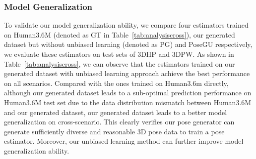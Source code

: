 \documentclass[runningheads]{llncs}
\begin{document}
\subsubsection{Model Generalization} 
To validate our model generalization ability, we compare four estimators trained on Human3.6M (denoted as GT in Table~\ref{tab:analysiscross}), our generated dataset but without unbiased learning (denoted as PG) and PoseGU respectively, we evaluate these estimators on test sets of 3DHP and 3DPW.
As shown in Table~\ref{tab:analysiscross}, we can observe that the estimators trained on our generated dataset with unbiased learning approach achieve the best performance on all scenarios. 
Compared with the ones trained on Human3.6m directly, although our generated dataset leads to a sub-optimal prediction performance on Human3.6M test set due to the data distribution mismatch between Human3.6M and our generated dataset, our generated dataset leads to a better model generalization on cross-scenario. 
This clearly verifies our pose generator can generate sufficiently diverse and reasonable 3D pose data to train a pose estimator. Moreover, our unbiased learning method can further improve model generalization ability.
\end{document}
